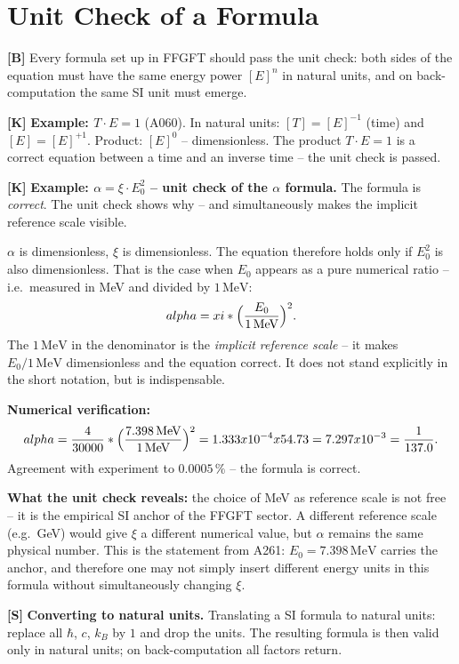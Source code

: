 \section{Unit Check of a Formula}

\textbf{[B]} Every formula set up in FFGFT should pass the unit check: both sides
of the equation must have the same energy power $[E]^n$ in natural units, and
on back-computation the same SI unit must emerge.

\textbf{[K]} \textbf{Example: $T\cdot E = 1$} (A060). In natural units:
$[T]=[E]^{-1}$ (time) and $[E]=[E]^{+1}$. Product: $[E]^0$ -- dimensionless.
The product $T\cdot E=1$ is a correct equation between a time and an inverse time
-- the unit check is passed.

\textbf{[K]} \textbf{Example: $\alpha=\xi\cdot E_0^2$ -- unit check of the
$\alpha$ formula.} The formula is \emph{correct}. The unit check shows why --
and simultaneously makes the implicit reference scale visible.

$\alpha$ is dimensionless, $\xi$ is dimensionless. The equation therefore holds
only if $E_0^2$ is also dimensionless. That is the case when $E_0$ appears as a
pure numerical ratio -- i.e.\ measured in MeV and divided by $1\,\text{MeV}$:
\[
  \alpha = \xi\cdot\Bigl(\frac{E_0}{1\,\text{MeV}}\Bigr)^2.
\]
The $1\,\text{MeV}$ in the denominator is the \emph{implicit reference scale} --
it makes $E_0/1\,\text{MeV}$ dimensionless and the equation correct. It does not
stand explicitly in the short notation, but is indispensable.

\textbf{Numerical verification:}
\[
  \alpha = \frac{4}{30000}\cdot\Bigl(\frac{7{.}398\,\text{MeV}}{1\,\text{MeV}}\Bigr)^2
  = 1{.}333\times10^{-4}\times54{.}73
  = 7{.}297\times10^{-3}
  = \frac{1}{137{.}0}.
\]
Agreement with experiment to $0{.}0005\,\%$ -- the formula is correct.

\textbf{What the unit check reveals:} the choice of MeV as reference scale is not
free -- it is the empirical SI anchor of the FFGFT sector. A different reference
scale (e.g.\ GeV) would give $\xi$ a different numerical value, but $\alpha$
remains the same physical number. This is the statement from A261: $E_0=7{.}398\,\text{MeV}$
carries the anchor, and therefore one may not simply insert different energy units
in this formula without simultaneously changing $\xi$.

\textbf{[S]} \textbf{Converting to natural units.} Translating a SI formula to
natural units: replace all $\hbar$, $c$, $k_B$ by $1$ and drop the units. The
resulting formula is then valid only in natural units; on back-computation all
factors return.

